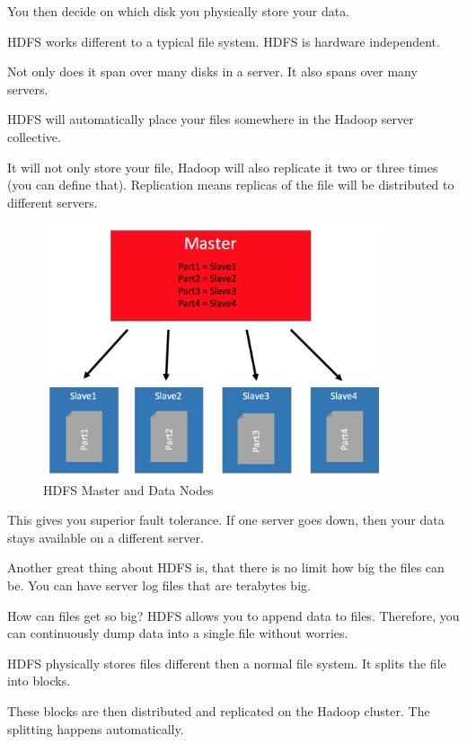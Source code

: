 \documentclass[12pt, numbers=noenddot]{scrreprt} %
\begin{document}
You then decide on which disk you physically store your data.

HDFS works different to a typical file system. HDFS is hardware independent.

Not only does it span over many disks in a server. It also spans over many servers.

HDFS will automatically place your files somewhere in the Hadoop server collective.

It will not only store your file, Hadoop will also replicate it two or three times (you can define that). Replication means replicas of the file will be distributed to different servers.

\begin{figure}[htbp]
  \centering
     \includegraphics[width=0.9\textwidth]{images/HDFS-Master-DataNodes.png}
  \caption{HDFS Master and Data Nodes}
  \label{fig:Bild1}
\end{figure}

This gives you superior fault tolerance. If one server goes down, then your data stays available on a different server.

Another great thing about HDFS is, that there is no limit how big the files can be. You can have server log files that are terabytes big.

How can files get so big? HDFS allows you to append data to files. Therefore, you can continuously dump data into a single file without worries.

HDFS physically stores files different then a normal file system. It splits the file into blocks.

These blocks are then distributed and replicated on the Hadoop cluster. The splitting happens automatically.
\end{document}
